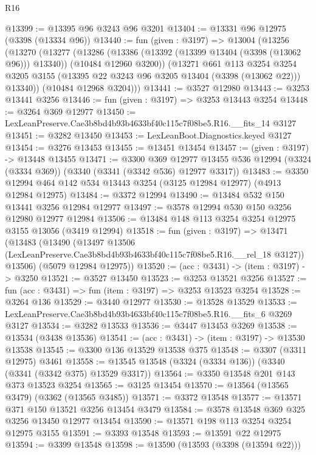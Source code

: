 \begin{lexlean}{R16}
\begin{coremodule}
@13399 := @13395 @96 @3243 @96 @3201
@13404 := @13331 @96 @12975 (@3398 (@13334 @96))
@13440 := fun (given : @3197) =>
  @13004
    (@13256
      (@13270
        (@13277
          (@13286
            (@13386 (@13392 (@13399 @13404 (@3398 (@13062 @96))) @13340))
            (@10484 @12960 @3200))
          (@13271
            @661
            @113
            @3254
            @3254
            @3205
            @3155
            (@13395 @22 @3243 @96 @3205 @13404 (@3398 (@13062 @22)))
            @13340))
        (@10484 @12968 @3204)))
@13441 := @3527 @12980
@13443 := @3253 @13441 @3256
@13446 := fun (given : @3197) => @3253 @13443 @3254
@13448 := @3264 @369 @12977
@13450 := LexLeanPreserve.Cae3b8bd4b93b4633bf40c115c7f08be5.R16.__fits_14 @3127
@13451 := @3282 @13450
@13453 := LexLeanBoot.Diagnostics.keyed @3127
@13454 := @3276 @13453
@13455 := @13451 @13454
@13457 := (given : @3197) -> @13448 @13455
@13471 := @3300
    @369
    @12977
    @13455
    @536
    @12994
    (@3324 (@3334 @369))
    (@3340 (@3341 (@3342 @536) @12977 @3317))
@13483 := @3350 @12994 @464 @142 @534 @13443 @3254 (@3125 @12984 @12977) (@4913 @12984 @12975)
@13484 := @3372 @12994
@13490 := @13484 @532 @150 @13441 @3256 @12984 @12977
@13497 := @3578 @12994 @530 @150 @3256 @12980 @12977 @12984
@13506 := @13484 @148 @113 @3254 @3254 @12975 @3155 @13056 (@3419 @12994)
@13518 := fun (given : @3197) =>
  @13471
    (@13483
      (@13490
        (@13497 @13506 (LexLeanPreserve.Cae3b8bd4b93b4633bf40c115c7f08be5.R16.__rel_18 @3127))
        @13506)
      (@5079 @12984 @12975))
@13520 := (acc : @3431) -> (item : @3197) -> @3250
@13521 := @3527 @13450
@13523 := @3253 @13521 @3256
@13527 := fun (acc : @3431) => fun (item : @3197) => @3253 @13523 @3254
@13528 := @3264 @136
@13529 := @3440 @12977
@13530 := @13528 @13529
@13533 := LexLeanPreserve.Cae3b8bd4b93b4633bf40c115c7f08be5.R16.__fits_6 @3269 @3127
@13534 := @3282 @13533
@13536 := @3447 @13453 @3269
@13538 := @13534 (@3438 @13536)
@13541 := (acc : @3431) -> (item : @3197) -> @13530 @13538
@13545 := @3300 @136 @13529 @13538 @375
@13548 := @3307 (@3311 @12975) @3461
@13558 := @13545 @13548 (@3324 (@3334 @136)) (@3340 (@3341 (@3342 @375) @13529 @3317))
@13564 := @3350 @13548 @201 @143 @373 @13523 @3254
@13565 := @3125 @13454
@13570 := @13564 (@13565 @3479) (@3362 (@13565 @3485))
@13571 := @3372 @13548
@13577 := @13571 @371 @150 @13521 @3256 @13454 @3479
@13584 := @3578 @13548 @369 @325 @3256 @13450 @12977 @13454
@13590 := @13571 @198 @113 @3254 @3254 @12975 @3155
@13591 := @3393 @13548
@13593 := @13591 @22 @12975
@13594 := @3399 @13548
@13598 := @13590 (@13593 (@3398 (@13594 @22)))

\end{coremodule}
\end{lexlean}
